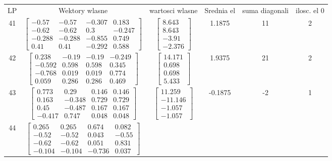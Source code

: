 \documentclass[a4paper,12pt]{article}
\begin{document}
\bgroup {} \vspace{0.2in} \begin{tabular}{c c c c c c}
LP &Wektory wlasne & wartosci wlasne & Srednia el & suma diagonali & ilosc. el 0\\
41
&
$\begin{bmatrix} -0.57 & -0.57 & -0.307 & 0.183 \\ -0.62 & -0.62 & 0.3 & -0.247 \\ -0.288 & -0.288 & -0.855 & 0.749 \\ 0.41 & 0.41 & -0.292 & 0.588 \end{bmatrix}$
&
$\begin{bmatrix} 8.643 \\ 8.643 \\ -3.91 \\ -2.376 \end{bmatrix}$
&
1.1875
&
11
&
2
\\
42
&
$\begin{bmatrix} 0.238 & -0.19 & -0.19 & -0.249 \\ -0.592 & 0.598 & 0.598 & 0.345 \\ -0.768 & 0.019 & 0.019 & 0.774 \\ 0.059 & 0.286 & 0.286 & 0.469 \end{bmatrix}$
&
$\begin{bmatrix} 14.171 \\ 0.698 \\ 0.698 \\ 5.433 \end{bmatrix}$
&
1.9375
&
21
&
2
\\
43
&
$\begin{bmatrix} 0.773 & 0.29 & 0.146 & 0.146 \\ 0.163 & -0.348 & 0.729 & 0.729 \\ 0.45 & -0.487 & 0.167 & 0.167 \\ -0.417 & 0.747 & 0.048 & 0.048 \end{bmatrix}$
&
$\begin{bmatrix} 11.259 \\ -11.146 \\ -1.057 \\ -1.057 \end{bmatrix}$
&
-0.1875
&
-2
&
1
\\
44
&
$\begin{bmatrix} 0.265 & 0.265 & 0.674 & 0.082 \\ -0.52 & -0.52 & 0.043 & -0.55 \\ -0.62 & -0.62 & 0.051 & 0.831 \\ -0.104 & -0.104 & -0.736 & 0.037 \end{bmatrix}$

\end{tabular}
\end{document}
